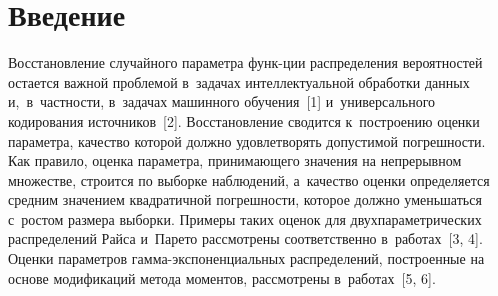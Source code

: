 
  
\vspace*{-1pt}



\thispagestyle{headings}

\begin{multicols}{2}

\label{st\stat}

\section{Введение }


Восстановление случайного параметра функ-\linebreak ции распределения вероятностей остается важ\-ной\linebreak 
проб\-ле\-мой в~задачах интеллектуальной обработки данных и,~в~част\-ности, в~задачах 
машинного обуче\-ния~[1] и~универсального кодирования источ\-ников~[2]. Восстановление 
сводится к~по\-стро\-ению оценки па\-ра\-мет\-ра, качество которой должно удовле\-тво\-рять допустимой 
погрешности. Как правило, оценка па\-ра\-мет\-ра, при\-ни\-ма\-юще\-го значения на непрерывном 
множестве, строится по выборке наблюдений, а~качество оценки определяется сред\-ним 
значением квадратичной по\-греш\-ности, которое долж\-но уменьшаться с~рос\-том размера 
выборки. Примеры таких оценок для двухпараметрических распределений Райса и~Парето 
рас\-смот\-ре\-ны соответственно в~работах~[3, 4]. Оценки параметров гам\-ма-экс\-по\-нен\-ци\-аль\-ных 
распределений, по\-стро\-ен\-ные на основе модификаций метода моментов, рассмотрены в~работах~[5, 6].


\end{multicols}
